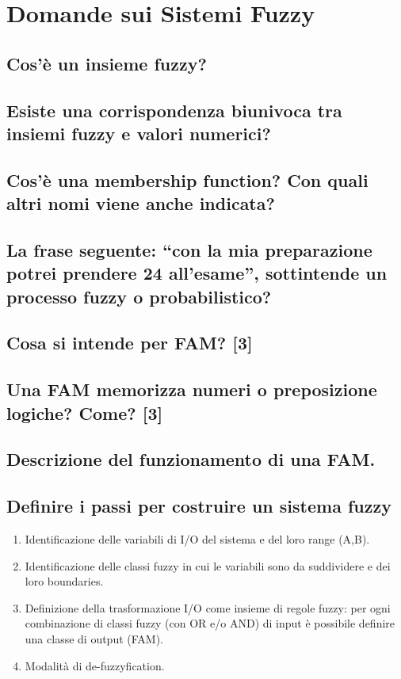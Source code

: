 \documentclass[\main/main.tex]{subfiles}
\begin{document}
\section{Domande sui Sistemi Fuzzy}

\subsection{Cos’è un insieme fuzzy?}
\subsection{Esiste una corrispondenza biunivoca tra insiemi fuzzy e valori numerici?}
\subsection{Cos’è una membership function? Con quali altri nomi viene anche indicata?}
\subsection{La frase seguente: “con la mia preparazione potrei prendere 24 all’esame”, sottintende un processo fuzzy o probabilistico?}
\subsection{Cosa si intende per FAM? [3]}
\subsection{Una FAM memorizza numeri o preposizione logiche? Come? [3]}
\subsection{Descrizione del funzionamento di una FAM.}


\subsection{Definire i passi per costruire un sistema fuzzy}
\begin{enumerate}
	\item Identificazione delle variabili di I/O del sistema e del loro range (A,B).
	\item Identificazione delle classi fuzzy in cui le variabili sono da suddividere e dei loro boundaries.
	\item Definizione della trasformazione I/O come insieme di regole fuzzy: per ogni combinazione di classi fuzzy (con OR e/o AND) di input è possibile definire una classe di output (FAM).
	\item Modalità di de-fuzzyfication.
\end{enumerate}
\end{document}
